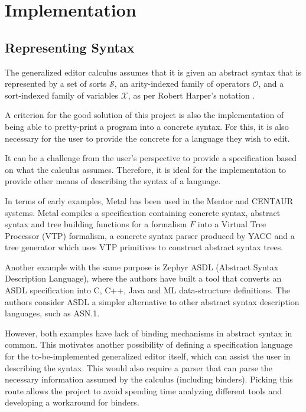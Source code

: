 \section{Implementation}

\subsection{Representing Syntax}
The generalized editor calculus\cite{aalborg} assumes that it is given an abstract syntax that is represented by a set of sorts $\mathcal{S}$, an arity-indexed family of operators $\mathcal{O}$, and a sort-indexed family of variables $\mathcal{X}$, as per Robert Harper's notation \cite{harper}.

A criterion for the good solution of this project is also the implementation of being able to pretty-print a program into a concrete syntax. For this, it is also necessary for the user to provide the concrete for a language they wish to edit.

It can be a challenge from the user's perspective to provide a specification based on what the calculus assumes. Therefore, it is ideal for the implementation to provide other means of describing the syntax of a language.

In terms of early examples, Metal\cite{metal} has been used in the Mentor\cite{mentor-applications} and CENTAUR\cite{centaur} systems.
Metal compiles a specification containing concrete syntax, abstract syntax and tree building functions for a formalism $F$ into a Virtual Tree Processor (VTP) formalism, a concrete syntax parser produced by YACC\cite{yacc} and a tree generator which uses VTP primitives to construct abstract syntax trees.

Another example with the same purpose is Zephyr ASDL (Abstract Syntax Description Language)\cite{zephyr}, where the authors have built a tool that converts an ASDL specification into C, C++, Java and ML data-structure definitions. The authors consider ASDL a simpler alternative to other abstract syntax description languages, such as ASN.1\cite{asn1}.

However, both examples have lack of binding mechanisms in abstract syntax in common. This motivates another possibility of defining a specification language for the to-be-implemented generalized editor itself, which can assist the user in describing the syntax. This would also require a parser that can parse the necessary information assumed by the calculus (including binders). Picking this route allows the project to avoid spending time analyzing different tools and developing a workaround for binders.

